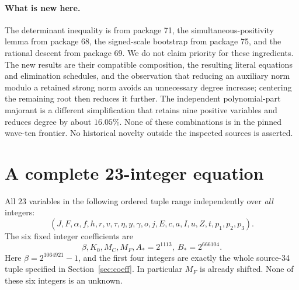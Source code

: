 \documentclass[11pt]{article}
\begin{document}
\paragraph{What is new here.}
The determinant inequality is from package 71, the simultaneous-positivity
lemma from package 68, the signed-scale bootstrap from package 75, and the
rational descent from package 69. We do not claim priority for these
ingredients. The new results are their compatible composition, the resulting
literal equations and elimination schedules, and the observation that
reducing an auxiliary norm modulo a retained strong norm avoids an unnecessary
degree increase; centering the remaining root then reduces it further.
The independent polynomial-part majorant is a different simplification
that retains nine positive variables and reduces degree by about $16.05\%$. None of these combinations is in the pinned wave-ten
frontier. No historical novelty outside the inspected sources is asserted.

\section{A complete 23-integer equation}
\label{sec:23}
All $23$ variables in the following ordered tuple range independently over
\emph{all} integers:
\[
 (J,F,\alpha,f,h,r,v,\tau,\eta,y,\gamma,o,j,E,c,a,I,u,Z,t,p_1,p_2,p_3).
\]
The six fixed integer coefficients are
\[
 \beta, K_0, M_C, M_F, A_*=2^{1113},\ B_*=2^{666104}.
\]
Here $\beta=2^{1064921}-1$, and the first four integers are exactly the
whole source-34 tuple specified in Section~\ref{sec:coeff}. In particular
$M_F$ is already shifted. None of these six integers is an unknown.
\end{document}
